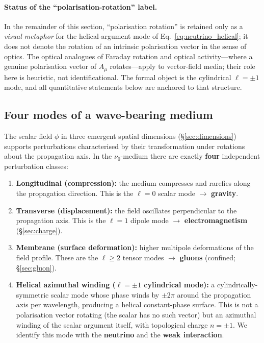 \documentclass[11pt]{article}
\begin{document}
\paragraph{Status of the ``polarisation-rotation'' label.}
In the remainder of this section, ``polarisation
rotation'' is retained only as a \emph{visual
metaphor} for the helical-argument mode of
Eq.~\eqref{eq:neutrino_helical}; it does not
denote the rotation of an intrinsic
polarisation vector in the sense of optics.
The optical analogues of Faraday rotation and
optical activity---where a genuine
polarisation vector of $A_\mu$ rotates---apply
to vector-field media; their role here is
heuristic, not identificational.  The formal
object is the cylindrical $\ell = \pm 1$ mode,
and all quantitative statements below are
anchored to that structure.

\subsection{Four modes of a wave-bearing medium}
\label{sec:four_modes}

The scalar field $\phi$ in three emergent spatial
dimensions (\S\ref{sec:dimensions}) supports
perturbations characterised by their transformation
under rotations about the propagation axis.
In the $\nu_0$-medium there are exactly
\textbf{four} independent perturbation classes:

\begin{enumerate}
  \item \textbf{Longitudinal (compression):}
    the medium compresses and rarefies along the
    propagation direction.  This is the $\ell = 0$
    scalar mode $\to$ \textbf{gravity}.
  \item \textbf{Transverse (displacement):}
    the field oscillates perpendicular to the
    propagation axis.  This is the $\ell = 1$
    dipole mode $\to$ \textbf{electromagnetism}
    (\S\ref{sec:charge}).
  \item \textbf{Membrane (surface deformation):}
    higher multipole deformations of the
    field profile.  These are the $\ell \geq 2$
    tensor modes $\to$ \textbf{gluons} (confined;
    \S\ref{sec:gluon}).
  \item \textbf{Helical azimuthal winding ($\ell=\pm 1$
    cylindrical mode):}
    a cylindrically-symmetric scalar mode whose
    phase winds by $\pm 2\pi$ around the
    propagation axis per wavelength, producing
    a helical constant-phase surface.  This is
    not a polarisation vector rotating (the
    scalar has no such vector) but an azimuthal
    winding of the scalar argument itself, with
    topological charge $n = \pm 1$.  We identify
    this mode with the \textbf{neutrino} and the
    \textbf{weak interaction}.
\end{enumerate}
\end{document}

